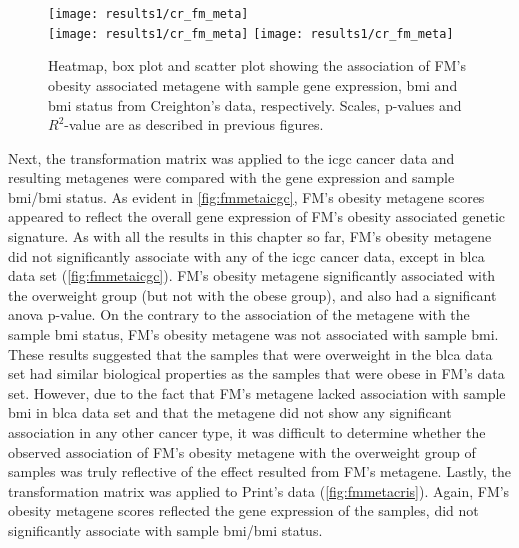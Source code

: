 \begin{figure}[htp!]
	\centering
	\texttt{[image: results1/cr\_fm\_meta]}\\
	\vspace{1em}
	\texttt{[image: results1/cr\_fm\_meta]}
	\hfill
	\texttt{[image: results1/cr\_fm\_meta]}
	\caption[FM's metagene in Creighton's  data]{Heatmap, box plot and scatter plot showing the association of FM's obesity associated metagene with sample gene expression, \gls{bmi} and \gls{bmi} status from Creighton's  data, respectively.
	Scales, p-values and $R^2$-value are as described in previous figures.}
	\label{fig:fmmetacr}
\end{figure}

Next, the transformation matrix was applied to the \gls{icgc} cancer data and resulting metagenes were compared with the gene expression and sample \gls{bmi}/\gls{bmi} status.
As evident in \cref{fig:fmmetaicgc}, FM's obesity metagene scores appeared to reflect the overall gene expression of FM's obesity associated genetic signature.
As with all the results in this chapter so far, FM's obesity metagene did not significantly associate with any of the \gls{icgc} cancer data, except in \gls{blca} data set (\cref{fig:fmmetaicgc}).
FM's obesity metagene significantly associated with the overweight group (but not with the obese group), and also had a significant \gls{anova} p-value.
On the contrary to the association of the metagene with the sample \gls{bmi} status, FM's obesity metagene was not associated with sample \gls{bmi}.
These results suggested that the samples that were overweight in the \gls{blca} data set had similar biological properties as the samples that were obese in FM's data set.
However, due to the fact that FM's metagene lacked association with sample \gls{bmi} in \gls{blca} data set and that the metagene did not show any significant association in any other cancer type, it was difficult to determine whether the observed association of FM's obesity metagene with the overweight group of samples was truly reflective of the effect resulted from FM's metagene.
Lastly, the transformation matrix was applied to Print's data (\cref{fig:fmmetacris}).
Again, FM's obesity metagene scores reflected the gene expression of the samples, did not significantly associate with sample \gls{bmi}/\gls{bmi} status.
\\

